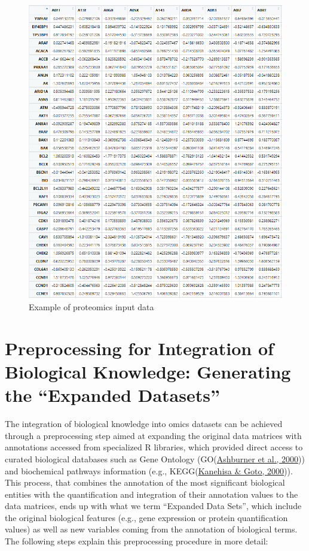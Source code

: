 \documentclass[a4paper, nobind]{templates/ociamthesis}
\begin{document}
\begin{figure}

{\centering \includegraphics[width=0.95\linewidth]{figures/chapter3/3-9_protein_data_example} 

}

\caption{Example of proteomics input data}\label{fig:fig3-9}
\end{figure}

\clearpage

\hypertarget{preprocess}{%
\section{Preprocessing for Integration of Biological Knowledge: Generating the ``Expanded Datasets''}\label{preprocess}}

The integration of biological knowledge into omics datasets can be achieved through a preprocessing step aimed at expanding the original data matrices with annotations accessed from specialized R libraries, which provided direct access to curated biological databases such as Gene Ontology (GO(\protect\hyperlink{ref-ashburner_gene_2000}{Ashburner et al., 2000})) and biochemical pathways information (e.g., KEGG(\protect\hyperlink{ref-kanehisa_kegg_2000}{Kanehisa \& Goto, 2000})). This process, that combines the annotation of the most significant biological entities with the quantification and integration of their annotation values to the data matrices, ends up with what we term ``Expanded Data Sets'', which include the original biological features (e.g., gene expression or protein quantification values) as well as new variables coming from the annotation of biological terms. The following steps explain this preprocessing procedure in more detail:
\end{document}
